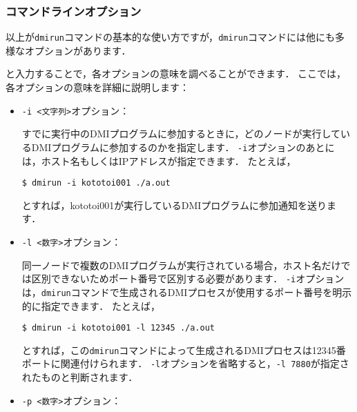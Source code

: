 \documentclass[report,12pt]{jsbook}
\begin{document}
\subsubsection{コマンドラインオプション}

以上が\texttt{dmirun}コマンドの基本的な使い方ですが，\texttt{dmirun}コマンドには他にも多様なオプションがあります．
と入力することで，各オプションの意味を調べることができます．
ここでは，各オプションの意味を詳細に説明します：
\begin{itemize}
\item \texttt{-i <文字列>}オプション：
  
  すでに実行中のDMIプログラムに参加するときに，どのノードが実行しているDMIプログラムに参加するのかを指定します．
  \texttt{-i}オプションのあとには，ホスト名もしくはIPアドレスが指定できます．
  たとえば，
  \begin{codev}
\begin{verbatim}
$ dmirun -i kototoi001 ./a.out
\end{verbatim}
  \end{codev}
  とすれば，kototoi001が実行しているDMIプログラムに参加通知を送ります．
\item \texttt{-l <数字>}オプション：
  
  同一ノードで複数のDMIプログラムが実行されている場合，ホスト名だけでは区別できないためポート番号で区別する必要があります．
  \texttt{-i}オプションは，\texttt{dmirun}コマンドで生成されるDMIプロセスが使用するポート番号を明示的に指定できます．
  たとえば，
  \begin{codev}
\begin{verbatim}
$ dmirun -i kototoi001 -l 12345 ./a.out
\end{verbatim}
  \end{codev}%
  とすれば，この\texttt{dmirun}コマンドによって生成されるDMIプロセスは12345番ポートに関連付けられます．
  \texttt{-l}オプションを省略すると，\texttt{-l 7880}が指定されたものと判断されます．
\item \texttt{-p <数字>}オプション：
  

\end{itemize}
\end{document}
